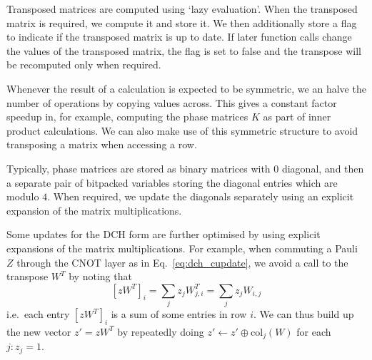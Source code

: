 Transposed matrices are computed using `lazy evaluation'. When the transposed matrix is required, we compute it and store it. We then additionally store a flag to indicate if the transposed matrix is up to date. If later function calls change the values of the transposed matrix, the flag is set to false and the transpose will be recomputed only when required.\par
Whenever the result of a calculation is expected to be symmetric, we an halve the number of operations by copying values across. This gives a constant factor speedup in, for example, computing the phase matrices $K$ as part of inner product calculations. We can also make use of this symmetric structure to avoid transposing a matrix when accessing a row.\par
Typically, phase matrices are stored as binary matrices with $0$ diagonal, and then a separate pair of bitpacked variables storing the diagonal entries which are modulo $4$. When required, we update the diagonals separately using an explicit expansion of the matrix multiplications.\par
Some updates for the DCH form are further optimised by using explicit expansions of the matrix multiplications. For example, when commuting a Pauli $Z$ through the CNOT layer as in Eq.~\ref{eq:dch_cupdate}, we avoid a call to the transpose $W^{T}$ by noting that
\[[zW^{T}]_{i} = \sum_{j}z_{j}W^{T}_{j,i}=\sum_{j}z_{j}W_{i,j} \]
i.e.\ each entry $[zW^{T}]_{i}$ is a sum of some entries in row $i$. We can thus build up the new vector $z'=zW^{T}$ by repeatedly doing $z'\gets z' \oplus \text{col}_{j}(W)$ for each $j:z_{j}=1$.
